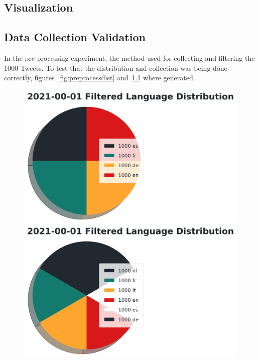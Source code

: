 \begin{landscape}
\chapter{Visualization}

\section{Data Collection Validation}

In the pre-processing experiment, the method used for collecting and filtering the 1000 Tweets.
To test that the distribution and collection was being done correctly, figures~\ref{fig:preprocessdist} and~\ref{fig:finaldist} where generated.


\begin{figure}[!htb]
  \includegraphics[width=\linewidth]{2021-00-01 Filtered Language Distribution.png}
  \caption[Pre-Process Filtered Language Distribution]{ }
  \label{fig:preprocessdist}
\endminipage\hfill
{}
  \includegraphics[width=\linewidth]{2021-01-01 Filtered Language Distribution - Final.png}
  \caption[Final Filtered Language Distribution]{ }
  \label{fig:finaldist}
\endminipage
\end{figure}


\end{landscape}
